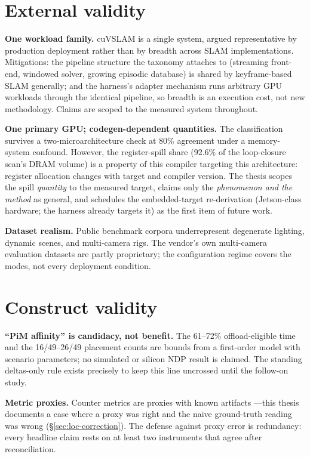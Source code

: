 \section{External validity}

\textbf{One workload family.} cuVSLAM is a single system, argued
representative by production deployment rather than by breadth across SLAM
implementations. Mitigations: the pipeline structure the taxonomy attaches
to (streaming front-end, windowed solver, growing episodic database) is
shared by keyframe-based SLAM generally; and the harness's adapter
mechanism runs arbitrary GPU workloads through the identical pipeline, so
breadth is an execution cost, not new methodology. Claims are scoped to the
measured system throughout.

\textbf{One primary GPU; codegen-dependent quantities.} The classification
survives a two-microarchitecture check at 80\% agreement under a memory-
system confound. However, the register-spill share (92.6\% of the
loop-closure scan's DRAM volume) is a property of this compiler targeting
this architecture: register allocation changes with target and compiler
version. The thesis scopes the spill \emph{quantity} to the measured
target, claims only the \emph{phenomenon and the method} as general, and
schedules the embedded-target re-derivation (Jetson-class hardware; the
harness already targets it) as the first item of future work.

\textbf{Dataset realism.} Public benchmark corpora underrepresent
degenerate lighting, dynamic scenes, and multi-camera rigs. The vendor's
own multi-camera evaluation datasets are partly proprietary; the
configuration regime covers the modes, not every deployment condition.

\section{Construct validity}

\textbf{``PiM affinity'' is candidacy, not benefit.} The 61--72\%
offload-eligible time and the 16/49--26/49 placement counts are bounds from
a first-order model with scenario parameters; no simulated or silicon NDP
result is claimed. The standing deltas-only rule exists precisely to keep
this line uncrossed until the follow-on study.

\textbf{Metric proxies.} Counter metrics are proxies with known artifacts
---this thesis documents a case where a proxy was right and the naive
ground-truth reading was wrong (\S\ref{sec:loc-correction}). The defense
against proxy error is redundancy: every headline claim rests on at least
two instruments that agree after reconciliation.

